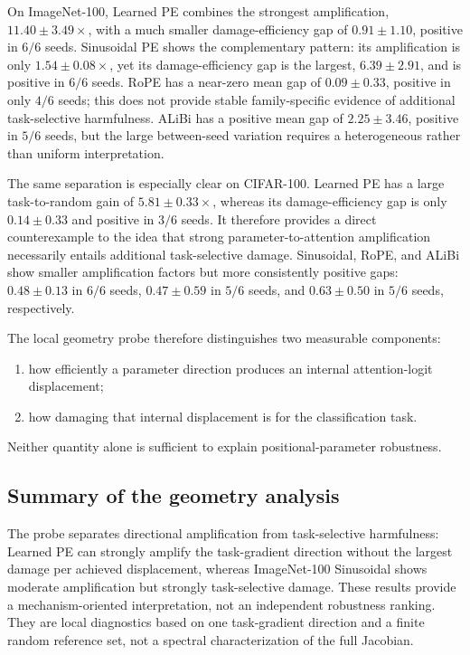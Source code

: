 \documentclass[preprint,12pt,authoryear]{elsarticle}
\begin{document}
On ImageNet-100, Learned PE combines the strongest amplification,
$11.40\pm3.49\times$, with a much smaller damage-efficiency gap of
$0.91\pm1.10$, positive in $6/6$ seeds. Sinusoidal PE shows the
complementary pattern: its amplification is only
$1.54\pm0.08\times$, yet its damage-efficiency gap is the largest,
$6.39\pm2.91$, and is positive in $6/6$ seeds. RoPE has a near-zero
mean gap of $0.09\pm0.33$, positive in only $4/6$ seeds; this does not
provide stable family-specific evidence of additional task-selective
harmfulness. ALiBi has a positive mean gap of $2.25\pm3.46$, positive
in $5/6$ seeds, but the large between-seed variation requires a
heterogeneous rather than uniform interpretation.

The same separation is especially clear on CIFAR-100. Learned PE has a
large task-to-random gain of $5.81\pm0.33\times$, whereas its
damage-efficiency gap is only $0.14\pm0.33$ and positive in $3/6$
seeds. It therefore provides a direct counterexample to the idea that
strong parameter-to-attention amplification necessarily entails
additional task-selective damage. Sinusoidal, RoPE, and ALiBi show
smaller amplification factors but more consistently positive gaps:
$0.48\pm0.13$ in $6/6$ seeds, $0.47\pm0.59$ in $5/6$ seeds, and
$0.63\pm0.50$ in $5/6$ seeds, respectively.

The local geometry probe therefore distinguishes two measurable
components:

\begin{enumerate}

    \item how efficiently a parameter direction produces an internal
    attention-logit displacement;

    \item how damaging that internal displacement is for the
    classification task.

\end{enumerate}

Neither quantity alone is sufficient to explain positional-parameter
robustness.

\subsection{Summary of the geometry analysis}

The probe separates directional amplification from task-selective
harmfulness: Learned PE can strongly amplify the task-gradient direction
without the largest damage per achieved displacement, whereas ImageNet-100
Sinusoidal shows moderate amplification but strongly task-selective damage.
These results provide a mechanism-oriented interpretation, not an independent
robustness ranking. They are local diagnostics based on one task-gradient
direction and a finite random reference set, not a spectral characterization
of the full Jacobian.
\end{document}
